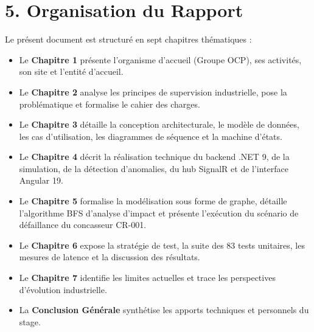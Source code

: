 \section*{5. Organisation du Rapport}
Le présent document est structuré en sept chapitres thématiques :
\begin{itemize}
    \item Le \textbf{Chapitre 1} présente l'organisme d'accueil (Groupe OCP), ses activités, son site et l'entité d'accueil.
    \item Le \textbf{Chapitre 2} analyse les principes de supervision industrielle, pose la problématique et formalise le cahier des charges.
    \item Le \textbf{Chapitre 3} détaille la conception architecturale, le modèle de données, les cas d'utilisation, les diagrammes de séquence et la machine d'états.
    \item Le \textbf{Chapitre 4} décrit la réalisation technique du backend .NET 9, de la simulation, de la détection d'anomalies, du hub SignalR et de l'interface Angular 19.
    \item Le \textbf{Chapitre 5} formalise la modélisation sous forme de graphe, détaille l'algorithme BFS d'analyse d'impact et présente l'exécution du scénario de défaillance du concasseur CR-001.
    \item Le \textbf{Chapitre 6} expose la stratégie de test, la suite des 83 tests unitaires, les mesures de latence et la discussion des résultats.
    \item Le \textbf{Chapitre 7} identifie les limites actuelles et trace les perspectives d'évolution industrielle.
    \item La \textbf{Conclusion Générale} synthétise les apports techniques et personnels du stage.
\end{itemize}